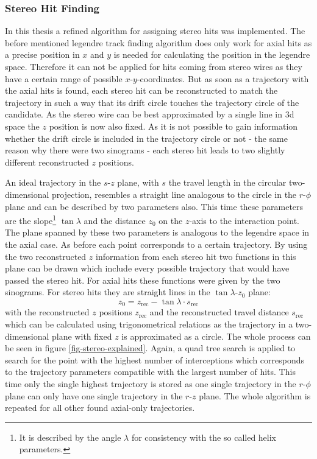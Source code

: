 \subsubsection{Stereo Hit Finding}

In this thesis a refined algorithm for assigning stereo hits was implemented. The before mentioned legendre track finding algorithm does only work for axial hits as a precise position in $x$ and $y$ is needed for calculating the position in the legendre space. Therefore it can not be applied for hits coming from stereo wires as they have a certain range of possible $x$-$y$-coordinates. But as soon as a trajectory with the axial hits is found, each stereo hit can be reconstructed to match the trajectory in such a way that its drift circle touches the trajectory circle of the candidate. As the stereo wire can be best approximated by a single line in 3d space the $z$ position is now also fixed. As it is not possible to gain information whether the drift circle is included in the trajectory circle or not - the same reason why there were two sinograms - each stereo hit leads to two slightly different reconstructed $z$ positions. 

An ideal trajectory in the $s$-$z$ plane, with $s$ the travel length in the circular two-dimensional projection, resembles a straight line analogous to the circle in the $r$-$\phi$ plane and can be described by two parameters also. This time these parameters are the slope\footnote{It is described by the angle $\lambda$ for consistency with the so called helix parameters.} $\tan \lambda$ and the distance $z_0$ on the $z$-axis to the interaction point. The plane spanned by these two parameters is analogous to the legendre space in the axial case. As before each point corresponds to a certain trajectory. By using the two reconstructed $z$ information from each stereo hit two functions in this plane can be drawn which include every possible trajectory that would have passed the stereo hit. For axial hits these functions were given by the two sinograms. For stereo hits they are straight lines in the $\tan \lambda$-$z_0$ plane:
$$ z_0 = z_\text{rec} - \tan \lambda \cdot s_\text{rec} $$
with the reconstructed $z$ positions $z_\text{rec}$ and the reconstructed travel distance $s_\text{rec}$ which can be calculated using trigonometrical relations as the trajectory in a two-dimensional plane with fixed $z$ is approximated as a circle. The whole process can be seen in figure \ref{fig-stereo-explained}. Again, a quad tree search is applied to search for the point with the highest number of interceptions which corresponds to the trajectory parameters compatible with the largest number of hits. This time only the single highest trajectory is stored as one single trajectory in the $r$-$\phi$ plane can only have one single trajectory in the $r$-$z$ plane. The whole algorithm is repeated for all other found axial-only trajectories. 

